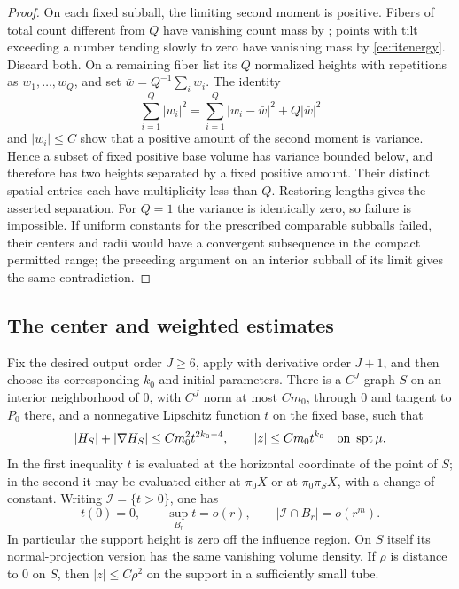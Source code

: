\begin{proof}
On each fixed subball, the limiting second moment is positive.
Fibers of total count different from $Q$ have vanishing count mass by
; points with tilt exceeding a number tending slowly
to zero have vanishing mass by \eqref{ce:fitenergy}.  Discard both.
On a remaining fiber list its $Q$ normalized heights with repetitions
as $w_1,\ldots,w_Q$, and set $\bar w=Q^{-1}\sum_iw_i$.  The identity
\[
 \sum_{i=1}^Q|w_i|^2
   =\sum_{i=1}^Q|w_i-\bar w|^2+Q|\bar w|^2
\]
and $|w_i|\le C$ show that a positive amount of the second moment
is variance.  Hence a subset of fixed positive base volume has
variance bounded below, and therefore has two heights separated by
a fixed positive amount.  Their distinct spatial entries each have
multiplicity less than $Q$.  Restoring lengths gives the asserted
separation.  For $Q=1$ the variance is identically zero, so failure
is impossible.  If uniform constants for the prescribed comparable
subballs failed, their centers and radii would have a convergent
subsequence in the compact permitted range; the preceding argument
on an interior subball of its limit gives the same contradiction.
\end{proof}

\subsection{The center and weighted estimates}

\begin{proposition}
 \label{ce:center}
Fix the desired output order $J\ge6$, apply  with
derivative order $J+1$, and then choose its corresponding $k_0$ and
initial parameters.  There is a $C^J$ graph $S$ on an
interior neighborhood of $0$, with $C^J$ norm at most $Cm_0$, through
$0$ and tangent to $P_0$ there, and a nonnegative Lipschitz function
$t$ on the fixed base, such that
\begin{equation}
 \label{ce:geometry}
 |H_S|+|\nabla H_S|\le Cm_0^2t^{2k_0-4},
 \qquad
 |z|\le Cm_0t^{k_0}\quad\hbox{on }\operatorname{spt}\mu.
\end{equation}
In the first inequality $t$ is evaluated at the horizontal coordinate
of the point of $S$; in the second it may be evaluated either at
$\pi_0X$ or at $\pi_0\pi_SX$, with a change of constant.
Writing $\mathcal I=\{t>0\}$, one has
\begin{equation}
 \label{ce:influence}
 t(0)=0,\qquad
 \sup_{B_r}t=o(r),\qquad
 |\mathcal I\cap B_r|=o(r^m).
\end{equation}
In particular the support height is zero off the influence region.
On $S$ itself its normal-projection version has the same vanishing
volume density.  If $\rho$ is distance to $0$ on $S$, then
$|z|\le C\rho^2$ on the support in a sufficiently small tube.
\end{proposition}

